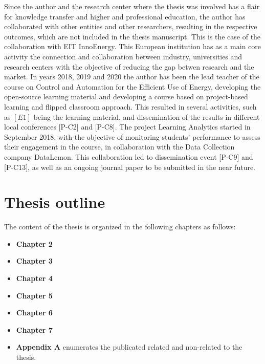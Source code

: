 Since the author and the research center where the thesis was involved has a flair for knowledge transfer and higher and professional education, the author has collaborated with other entities and other researchers, resulting in the respective outcomes, which are not included in the thesis manuscript. This is the case of the collaboration with EIT InnoEnergy. This European institution has as a main core activity the connection and collaboration between industry, universities and research centers with the objective of reducing the gap betwen research and the market. In years 2018, 2019 and 2020 the author has been the lead teacher of the course on Control and Automation for the Efficient Use of Energy, developing the open-source learning material and developing a course based on project-based learning and flipped classroom approach. This resulted in several activities, such as $[E1]$ being the learning material, and dissemination of the results in different local conferences [P-C2] and [P-C8]. The project Learning Analytics started in September 2018, with the objective of monitoring students' performance to assess their engagement in the course, in collaboration with the Data Collection company DataLemon. This collaboration led to dissemination event [P-C9] and [P-C13], as well as an ongoing journal paper to be submitted in the near future.  


\newpage 
\section{Thesis outline}
The content of the thesis is organized in the following chapters as follows:
\begin{itemize}
\item \textbf{Chapter 2}
\item \textbf{Chapter 3}
\item \textbf{Chapter 4}
\item \textbf{Chapter 5}
\item \textbf{Chapter 6}
\item \textbf{Chapter 7}
\item \textbf{Appendix A} enumerates the publicated related and non-related to the thesis. 
\end{itemize}


